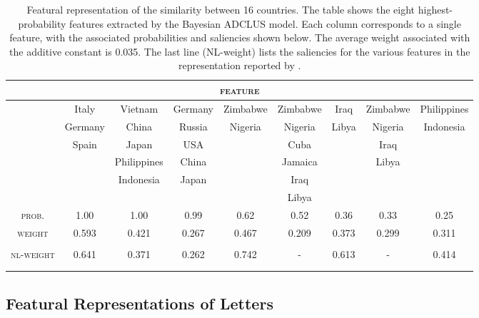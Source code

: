 \documentclass[11pt]{article}
\newcommand{\capspace}{}
\begin{document}
\setlength{\tabcolsep}{2pt}
\begin{table}[t]
\caption{\capspace Featural representation of the similarity between 16 countries. The table shows the eight highest-probability features extracted by the Bayesian ADCLUS model. Each column corresponds to a single feature, with the associated probabilities and saliencies shown below. The average weight associated with the additive constant is 0.035. The last line (NL-weight) lists the saliencies for the various features in the representation reported by \protect{}.}
\label{countries} \begin{center}
\footnotesize
    \begin{tabular}{ccccccccc}\\
      \hline
      \multicolumn{9}{c}{\textsc{feature}} \\
      \hline
 &Italy & Vietnam & Germany & Zimbabwe & Zimbabwe & Iraq & Zimbabwe & Philippines \\
 &Germany & China & Russia & Nigeria & Nigeria & Libya & Nigeria & Indonesia \\
 &Spain & Japan &USA &  & Cuba &  & Iraq &   \\
 & & Philippines & China &  & Jamaica &  & Libya &  \\
 & & Indonesia & Japan &  & Iraq &  &  &  \\
 & &  &  &  & Libya &  &  &   \\
      \hline
\textsc{prob.} &
1.00   & 1.00 &   0.99&    0.62 &   0.52 &   0.36 &   0.33 &   0.25 \\
\textsc{weight} &    0.593 & 0.421&    0.267&    0.467&    0.209&
    0.373&    0.299&    0.311 \\
\\
\textsc{nl-weight} & 0.641 & 0.371 & 0.262 & 0.742 & - & 0.613 & - & 0.414 \\
\hline \\ \\
    \end{tabular}
\end{center}
\end{table}





\subsection{Featural Representations of Letters}
\end{document}
